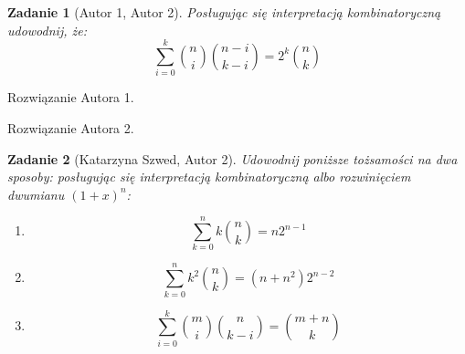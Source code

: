 \documentclass{mwart}
\newtheorem{zad}{Zadanie}[section]
\begin{document}
\begin{zad}[Autor 1, Autor 2]
    Posługując się interpretacją kombinatoryczną udowodnij, że:
    \[ \sum_{i=0}^{k} \binom{n}{i} \binom{n-i}{k-i} = 2^k \binom{n}{k} \]
\end{zad}
\begin{mdframed}
    Rozwiązanie Autora 1.
\end{mdframed}
\begin{mdframed}
    Rozwiązanie Autora 2.
\end{mdframed}




\begin{zad}[Katarzyna Szwed, Autor 2]
    Udowodnij poniższe tożsamości na dwa sposoby: posługując się interpretacją
    kombinatoryczną albo rozwinięciem dwumianu $(1 + x)^n$:
    \begin{enumerate}
        \item \[\sum_{k=0}^{n}k\binom{n}{k} = n2^{n-1}\]
        \item \[\sum_{k=0}^{n}k^2\binom{n}{k}= (n+n^2)2^{n-2}\]
        \item \[\sum_{i=0}^{k}\binom{m}{i}\binom{n}{k-i} = \binom{m+n}{k} \]
    \end{enumerate}
\end{zad}
\end{document}
